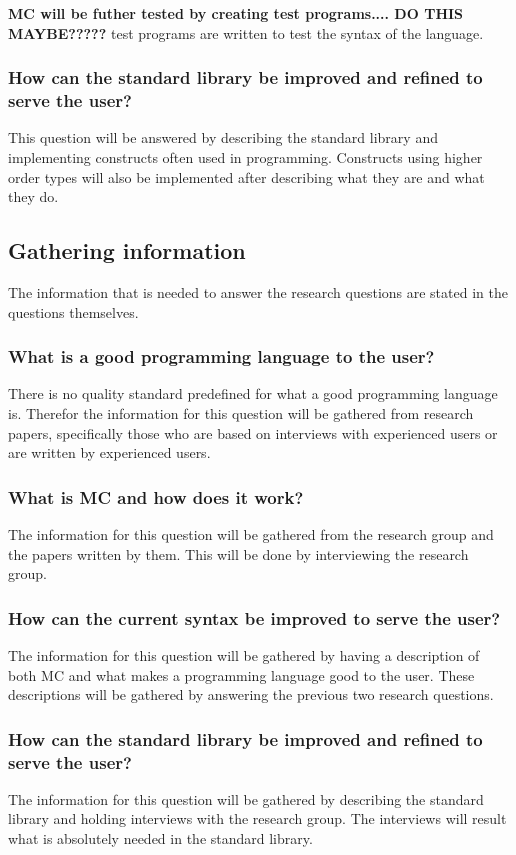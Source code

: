 \textbf{MC will be futher tested by creating test programs.... DO THIS MAYBE?????}
test programs are written to test the syntax of the language.

\subsubsection{How can the standard library be improved and refined to serve the user?}
This question will be answered by describing the standard library and implementing constructs often used in programming.
Constructs using higher order types will also be implemented after describing what they are and what they do.



\subsection{Gathering information}
The information that is needed to answer the research questions are stated in the questions themselves.


\subsubsection{What is a good programming language to the user?}
There is no quality standard predefined for what a good programming language is.
Therefor the information for this question will be gathered from research papers, specifically those who are based on interviews with experienced users or are written by experienced users.

\subsubsection{What is MC and how does it work?}
The information for this question will be gathered from the research group and the papers written by them.
This will be done by interviewing the research group.

\subsubsection{How can the current syntax be improved to serve the user?}
The information for this question will be gathered by having a description of both MC and what makes a programming language good to the user.
These descriptions will be gathered by answering the previous two research questions.

\subsubsection{How can the standard library be improved and refined to serve the user?}
The information for this question will be gathered by describing the standard library and holding interviews with the research group.
The interviews will result what is absolutely needed in the standard library.


